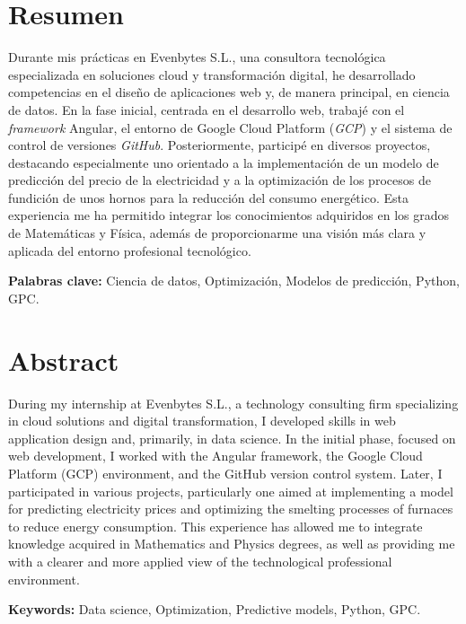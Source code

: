\section*{Resumen}

Durante mis prácticas en Evenbytes S.L., una consultora tecnológica especializada en soluciones cloud y transformación digital, he desarrollado competencias en el diseño de aplicaciones web y, de manera principal, en ciencia de datos. En la fase inicial, centrada en el desarrollo web, trabajé con el \textit{framework} Angular, el entorno de Google Cloud Platform (\textit{GCP}) y el sistema de control de versiones \textit{GitHub}. Posteriormente, participé en diversos proyectos, destacando especialmente uno orientado a la implementación de un modelo de predicción del precio de la electricidad y a la optimización de los procesos de fundición de unos hornos para la reducción del consumo energético. Esta experiencia me ha permitido integrar los conocimientos adquiridos en los grados de Matemáticas y Física, además de proporcionarme una visión más clara y aplicada del entorno profesional tecnológico.

\vspace{1cm}
\noindent\textbf{Palabras clave:} Ciencia de datos, Optimización, Modelos de predicción, Python, GPC.
 

\section*{Abstract}

During my internship at Evenbytes S.L., a technology consulting firm specializing in cloud solutions and digital transformation, I developed skills in web application design and, primarily, in data science. In the initial phase, focused on web development, I worked with the Angular framework, the Google Cloud Platform (GCP) environment, and the GitHub version control system. Later, I participated in various projects, particularly one aimed at implementing a model for predicting electricity prices and optimizing the smelting processes of furnaces to reduce energy consumption. This experience has allowed me to integrate knowledge acquired in Mathematics and Physics degrees, as well as providing me with a clearer and more applied view of the technological professional environment.

\vspace{1cm}
\noindent\textbf{Keywords:} Data science, Optimization, Predictive models, Python, GPC.

